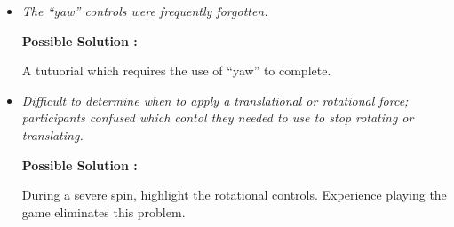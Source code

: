 \begin{itemize}
	\item \emph{The ``yaw'' controls were frequently forgotten.}
        
        \textbf{Possible Solution : } \parbox[t]{5in}{A tutuorial which requires the use of ``yaw'' to complete.}

	\item \emph{Difficult to determine when to apply a translational or rotational force; participants confused which contol they needed to use to stop rotating or translating.}
        
        \textbf{Possible Solution : } \parbox[t]{5in}{During a severe spin, highlight the rotational controls.  Experience playing the game eliminates this problem.}

\end{itemize}




